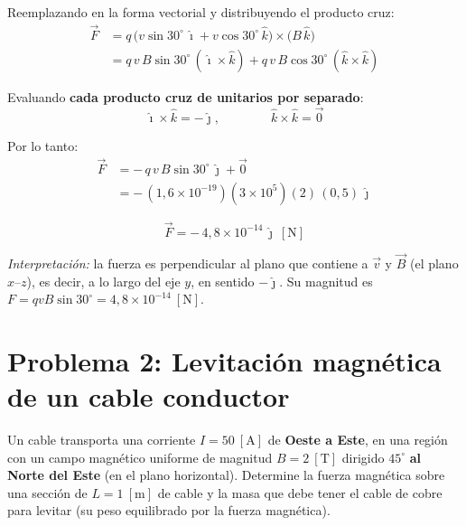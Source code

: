 \documentclass[12pt,letterpaper]{article}
\begin{document}
\bigskip

\noindent Reemplazando en la forma vectorial y distribuyendo el producto cruz:
\begin{align*}
    \vec{F} &= q\,\bigl(v\sin30^\circ\,\hat{\imath} + v\cos30^\circ\,\hat{k}\bigr)\times\bigl(B\,\hat{k}\bigr) \\[4pt]
            &= q\,v\,B\sin30^\circ\,(\hat{\imath}\times\hat{k})
             + q\,v\,B\cos30^\circ\,(\hat{k}\times\hat{k})
\end{align*}

\noindent Evaluando \textbf{cada producto cruz de unitarios por separado}:
\[
    \hat{\imath}\times\hat{k} = -\hat{\jmath},
    \qquad\qquad
    \hat{k}\times\hat{k} = \vec{0}
\]

\noindent Por lo tanto:
\begin{align*}
    \vec{F} &= -\,q\,v\,B\sin30^\circ\,\hat{\jmath} + \vec{0} \\[4pt]
            &= -\,(1{,}6\times10^{-19})(3\times10^{5})(2)\,(0{,}5)\,\hat{\jmath}
\end{align*}

\[
    \boxed{\vec{F} = -\,4{,}8\times10^{-14}\,\hat{\jmath}\ [\text{N}]}
\]

\noindent\small\textit{Interpretaci\'on:} la fuerza es perpendicular al plano que contiene a
$\vec{v}$ y $\vec{B}$ (el plano $x$--$z$), es decir, a lo largo del eje $y$, en sentido
$-\hat{\jmath}$. Su magnitud es $F = qvB\sin30^\circ = 4{,}8\times10^{-14}\ [\text{N}]$.
\normalsize

\newpage

\section*{Problema 2: Levitaci\'on magn\'etica de un cable conductor}

\noindent Un cable transporta una corriente $I = 50\ [\text{A}]$ de \textbf{Oeste a Este}, en una
regi\'on con un campo magn\'etico uniforme de magnitud $B = 2\ [\text{T}]$ dirigido
$45^\circ$ \textbf{al Norte del Este} (en el plano horizontal). Determine la fuerza magn\'etica
sobre una secci\'on de $L = 1\ [\text{m}]$ de cable y la masa que debe tener el cable de cobre
para levitar (su peso equilibrado por la fuerza magn\'etica).

\medskip
\end{document}

